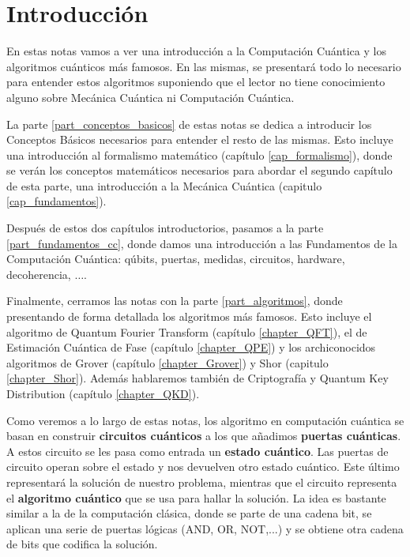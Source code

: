 \documentclass[a4paper,11pt]{book} %
\numberwithin{equation}{chapter}
\begin{document}
\chapter*{Introducción}

En estas notas vamos a ver una introducción a la Computación Cuántica y los algoritmos cuánticos más famosos. En las mismas, se presentará todo lo necesario para entender estos algoritmos suponiendo que el lector no tiene conocimiento alguno sobre Mecánica Cuántica ni Computación Cuántica. 

La parte \ref{part_conceptos_basicos} de estas notas se dedica a introducir los Conceptos Básicos necesarios para entender el resto de las mismas. Esto incluye una introducción al formalismo matemático (capítulo \ref{cap_formalismo}), donde se verán los conceptos matemáticos necesarios para abordar el segundo capítulo de esta parte, una introducción a la Mecánica Cuántica (capitulo \ref{cap_fundamentos}). 


Después de estos dos capítulos introductorios, pasamos a la parte \ref{part_fundamentos_cc}, donde damos una introducción a las Fundamentos de la Computación Cuántica: qúbits, puertas, medidas, circuitos, hardware, decoherencia, $\dots$.


Finalmente, cerramos las notas con la parte \ref{part_algoritmos}, donde presentando de forma detallada los algoritmos más famosos. Esto incluye el algoritmo de Quantum Fourier Transform (capítulo \ref{chapter_QFT}), el de Estimación Cuántica de Fase (capítulo \ref{chapter_QPE}) y los archiconocidos algoritmos de Grover (capítulo \ref{chapter_Grover}) y Shor (capitulo \ref{chapter_Shor}). Además hablaremos también de Criptografía y Quantum Key Distribution (capítulo \ref{chapter_QKD}). 

Como veremos a lo largo de estas notas, los algoritmo en computación cuántica se basan en construir \textbf{circuitos cuánticos} a los que añadimos \textbf{puertas cuánticas}. A estos circuito se les pasa como entrada un \textbf{estado cuántico}. Las puertas de circuito operan sobre el estado y nos devuelven otro estado cuántico. Este último representará la solución de nuestro problema, mientras que el circuito representa el \textbf{algoritmo cuántico} que se usa para hallar la solución. La idea es bastante similar a la de la computación clásica, donde se parte de una cadena bit, se aplican una serie de puertas lógicas (AND, OR, NOT,...) y se obtiene otra cadena de bits que codifica la solución. 
\end{document}
